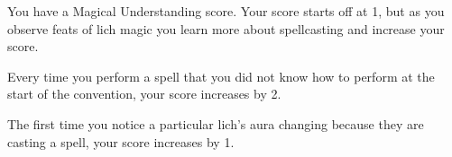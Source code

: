 \documentclass[green]{Sel}
\begin{document}
\name{\gSollersMagicalUnderstanding{}}

You have a Magical Understanding score. Your score starts off at 1, but as you observe feats of lich magic you learn more about spellcasting and increase your score.

Every time you perform a spell that you did not know how to perform at the start of the convention, your score increases by 2.

The first time you notice a particular lich's aura changing because they are casting a spell, your score increases by 1.
\end{document}
